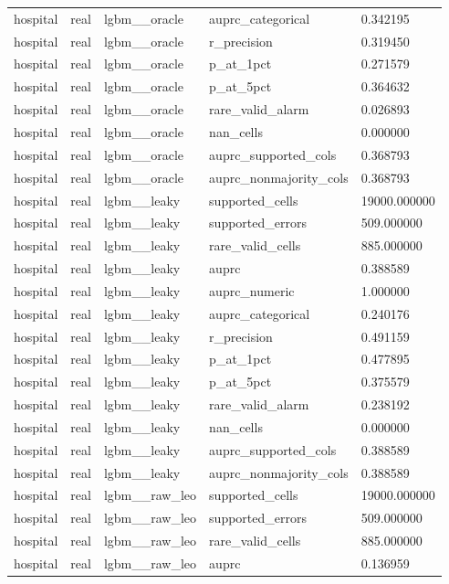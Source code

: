 \begin{tabular}{lllll}
hospital & real & lgbm\_\_oracle & auprc\_categorical & 0.342195 \\
hospital & real & lgbm\_\_oracle & r\_precision & 0.319450 \\
hospital & real & lgbm\_\_oracle & p\_at\_1pct & 0.271579 \\
hospital & real & lgbm\_\_oracle & p\_at\_5pct & 0.364632 \\
hospital & real & lgbm\_\_oracle & rare\_valid\_alarm & 0.026893 \\
hospital & real & lgbm\_\_oracle & nan\_cells & 0.000000 \\
hospital & real & lgbm\_\_oracle & auprc\_supported\_cols & 0.368793 \\
hospital & real & lgbm\_\_oracle & auprc\_nonmajority\_cols & 0.368793 \\
hospital & real & lgbm\_\_leaky & supported\_cells & 19000.000000 \\
hospital & real & lgbm\_\_leaky & supported\_errors & 509.000000 \\
hospital & real & lgbm\_\_leaky & rare\_valid\_cells & 885.000000 \\
hospital & real & lgbm\_\_leaky & auprc & 0.388589 \\
hospital & real & lgbm\_\_leaky & auprc\_numeric & 1.000000 \\
hospital & real & lgbm\_\_leaky & auprc\_categorical & 0.240176 \\
hospital & real & lgbm\_\_leaky & r\_precision & 0.491159 \\
hospital & real & lgbm\_\_leaky & p\_at\_1pct & 0.477895 \\
hospital & real & lgbm\_\_leaky & p\_at\_5pct & 0.375579 \\
hospital & real & lgbm\_\_leaky & rare\_valid\_alarm & 0.238192 \\
hospital & real & lgbm\_\_leaky & nan\_cells & 0.000000 \\
hospital & real & lgbm\_\_leaky & auprc\_supported\_cols & 0.388589 \\
hospital & real & lgbm\_\_leaky & auprc\_nonmajority\_cols & 0.388589 \\
hospital & real & lgbm\_\_raw\_leo & supported\_cells & 19000.000000 \\
hospital & real & lgbm\_\_raw\_leo & supported\_errors & 509.000000 \\
hospital & real & lgbm\_\_raw\_leo & rare\_valid\_cells & 885.000000 \\
hospital & real & lgbm\_\_raw\_leo & auprc & 0.136959 \\

\end{tabular}
